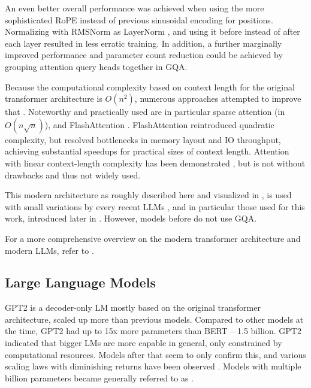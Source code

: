 An even better overall performance was achieved when using the more sophisticated \gls{RoPE} instead of previous sinusoidal encoding for positions.
Normalizing with RMSNorm as LayerNorm \cite{ba_layer_2016}, and using it before instead of after each layer resulted in less erratic training.
In addition, a further marginally improved performance and parameter count reduction could be achieved by grouping attention query heads together in \gls{GQA}.

Because the computational complexity based on context length for the original transformer architecture is $O(n^2)$, numerous approaches attempted to improve that \cite{child_generating_2019, wu_fastformer_2021, bolya_hydra_2022, hua_transformer_2022, dao_flashattention_2022}.
Noteworthy and practically used are in particular sparse attention \cite{child_generating_2019} (in $O(n\sqrt{n})$), and FlashAttention \cite{dao_flashattention_2022}.
FlashAttention reintroduced quadratic complexity, but resolved bottlenecks in memory layout and IO throughput, achieving substantial speedups for practical sizes of context length.
Attention with linear context-length complexity has been demonstrated \cite{wu_fastformer_2021, hua_transformer_2022}, but is not without drawbacks and thus not widely used.




This modern architecture as roughly described here and visualized in , is used with small variations by every recent \glspl{LLM} \cite{naveed_comprehensive_2023}, and in particular those used for this work, introduced later in .
However, models before  do not use \gls{GQA}.

For a more comprehensive overview on the modern transformer architecture and modern \glspl{LLM}, refer to \cite{naveed_comprehensive_2023}.

\subsection{Large Language Models}\label{sub:llm}

\gls{GPT2} \cite{radford_language_2019} is a decoder-only \gls{LM} mostly based on the original transformer architecture, scaled up more than previous models.
Compared to other models at the time, \gls{GPT2} had up to 15x more parameters than \gls{BERT} -- 1.5 billion.
\gls{GPT2} indicated that bigger \glspl{LM} are more capable in general, only constrained by computational resources.
Models after that seem to only confirm this, and various scaling laws with diminishing returns have been observed \cite{rae_scaling_2022, hoffmann_training_2022}.
Models with multiple billion parameters became generally referred to as .

